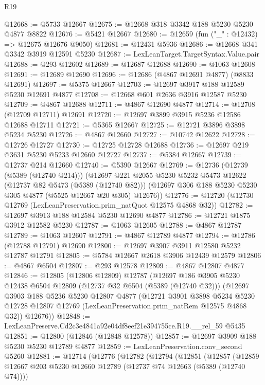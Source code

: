 \begin{lexlean}{R19}
\begin{coremodule}
@12668 := @5733 @12667
@12675 := @12668 @318 @3342 @188 @5230 @5230 @4877 @8822
@12676 := @5421 @12667
@12680 := @12659 (fun ("_" : @12432) => @12675 @12676 @9050)
@12681 := @12431 @5936
@12686 := @12668 @341 @3342 @3919 @12591 @5230
@12687 := LexLeanTarget.TargetSyntax.Value.pair
@12688 := @293 @12602
@12689 := @12687 @12688
@12690 := @1063 @12608
@12691 := @12689 @12690
@12696 := @12686 (@4867 @12691 @4877) (@8833 @12691)
@12697 := @5375 @12667
@12703 := @12697 @3917 @188 @12589 @5230 @12691 @4877
@12708 := @12668 @601 @2636 @3916 @12587 @5230
@12709 := @4867 @12688
@12711 := @4867 @12690 @4877
@12714 := @12708 (@12709 @12711) @12691
@12720 := @12697 @3899 @3915 @5236 @12586 @12688 @12711
@12721 := @5365 @12667
@12725 := @12721 @3896 @3898 @5234 @5230
@12726 := @4867 @12660
@12727 := @10742 @12622
@12728 := @12726 @12727
@12730 := @12725 @12728 @12688
@12736 := @12697 @219 @3631 @5230 @5233 @12660 @12727
@12737 := @5384 @12667
@12739 := @12737 @214 @12660
@12740 := @5390 @12667
@12769 := @12736
    (@12739 (@5389 (@12740 @214)))
    (@12697
      @221
      @2055
      @5230
      @5232
      @5473
      @12622
      (@12737 @82 @5473 (@5389 (@12740 @82)))
      (@12697 @306 @188 @5230 @5230 @305 @4877 (@5525 @12667 @20 @305) @12676))
@12776 := @12720 (@12730 @12769 (LexLeanPreservation.prim_natQuot @12575 @4868 @32))
@12782 := @12697 @3913 @188 @12584 @5230 @12690 @4877
@12786 := @12721 @1875 @3912 @12582 @5230
@12787 := @1063 @12605
@12788 := @4867 @12787
@12789 := @1063 @12607
@12791 := @4867 @12789 @4877
@12794 := @12786 (@12788 @12791) @12690
@12800 := @12697 @3907 @3911 @12580 @5232 @12787 @12791
@12805 := @5784 @12667 @2618 @3906 @12439 @12579
@12806 := @4867 @6504
@12807 := @293 @12578
@12809 := @4867 @12807 @4877
@12846 := @12805
    (@12806 @12809)
    @12787
    (@12697
      @186
      @3905
      @5230
      @12438
      @6504
      @12809
      (@12737 @32 @6504 (@5389 (@12740 @32)))
      (@12697
        @3903
        @188
        @5236
        @5230
        @12807
        @4877
        (@12721
          @3901
          @3898
          @5234
          @5230
          @12728
          @12807
          @12769
          (LexLeanPreservation.prim_natRem @12575 @4868 @32))
        @12676))
@12848 := LexLeanPreserve.Cd2c3e4841a92e04df8eef21e394755ce.R19.__rel_59 @5435
@12851 := @12800 (@12846 (@12848 @12578))
@12857 := @12697 @3909 @188 @5230 @5230 @12789 @4877
@12859 := LexLeanPreservation.conv_second @5260
@12881 := @12714
    (@12776
      (@12782
        (@12794
          (@12851
            (@12857
              (@12859 @12667 @203 @5230 @12660 @12789 (@12737 @74 @12663 (@5389 (@12740 @74))))

\end{coremodule}
\end{lexlean}
